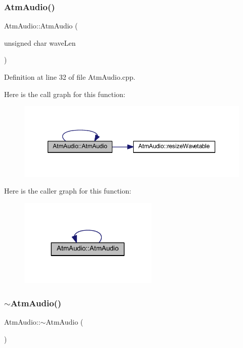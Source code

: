 \subsubsection{\texorpdfstring{Atm\+Audio()}{AtmAudio()}}
{\footnotesize\ttfamily Atm\+Audio\+::\+Atm\+Audio (\begin{DoxyParamCaption}\item[{unsigned char}]{wave\+Len }\end{DoxyParamCaption})}



Definition at line 32 of file Atm\+Audio.\+cpp.

Here is the call graph for this function\+:
\nopagebreak
\begin{figure}[H]
\begin{center}
\leavevmode
\includegraphics[width=350pt]{class_atm_audio_adef4ded5a0c213fe421025e17de0605e_cgraph}
\end{center}
\end{figure}
Here is the caller graph for this function\+:
\nopagebreak
\begin{figure}[H]
\begin{center}
\leavevmode
\includegraphics[width=188pt]{class_atm_audio_adef4ded5a0c213fe421025e17de0605e_icgraph}
\end{center}
\end{figure}
\mbox{\label{class_atm_audio_ad4d285853a6790f23fd8dd24998a830b}} 
\subsubsection{\texorpdfstring{$\sim$\+Atm\+Audio()}{~AtmAudio()}}
{\footnotesize\ttfamily Atm\+Audio\+::$\sim$\+Atm\+Audio (\begin{DoxyParamCaption}{ }\end{DoxyParamCaption})}



